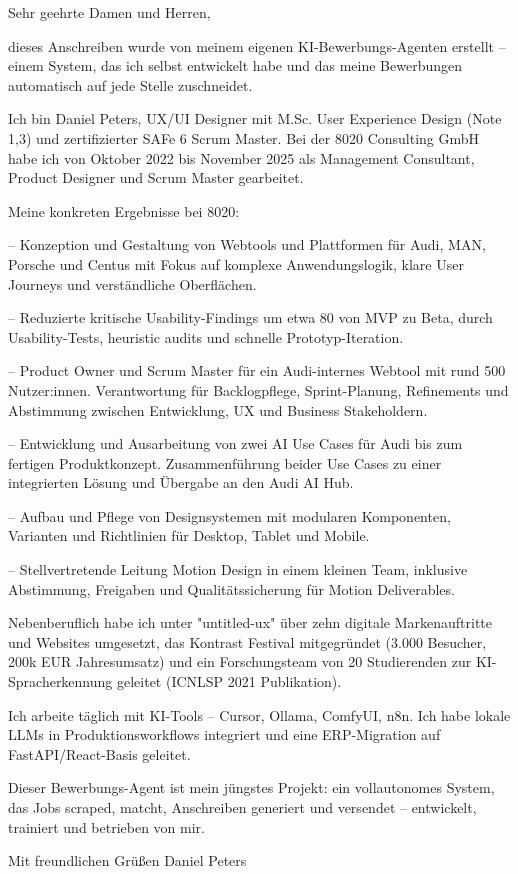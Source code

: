Sehr geehrte Damen und Herren,

dieses Anschreiben wurde von meinem eigenen KI-Bewerbungs-Agenten erstellt -- einem System,
das ich selbst entwickelt habe und das meine Bewerbungen automatisch auf jede Stelle zuschneidet.

Ich bin Daniel Peters, UX/UI Designer mit M.Sc. User Experience Design (Note 1,3) und
zertifizierter SAFe 6 Scrum Master. Bei der 8020 Consulting GmbH habe ich von Oktober 2022
bis November 2025 als Management Consultant, Product Designer und Scrum Master gearbeitet.

Meine konkreten Ergebnisse bei 8020:

-- Konzeption und Gestaltung von Webtools und Plattformen für Audi, MAN, Porsche und Centus
   mit Fokus auf komplexe Anwendungslogik, klare User Journeys und verständliche Oberflächen.

-- Reduzierte kritische Usability-Findings um etwa 80%
   von MVP zu Beta, durch Usability-Tests, heuristic audits und schnelle Prototyp-Iteration.

-- Product Owner und Scrum Master für ein Audi-internes Webtool mit rund 500 Nutzer:innen.
   Verantwortung für Backlogpflege, Sprint-Planung, Refinements und Abstimmung zwischen
   Entwicklung, UX und Business Stakeholdern.

-- Entwicklung und Ausarbeitung von zwei AI Use Cases für Audi bis zum fertigen Produktkonzept.
   Zusammenführung beider Use Cases zu einer integrierten Lösung und Übergabe an den Audi AI Hub.

-- Aufbau und Pflege von Designsystemen mit modularen Komponenten, Varianten und Richtlinien
   für Desktop, Tablet und Mobile.

-- Stellvertretende Leitung Motion Design in einem kleinen Team, inklusive Abstimmung,
   Freigaben und Qualitätssicherung für Motion Deliverables.

Nebenberuflich habe ich unter "untitled-ux" über zehn digitale Markenauftritte und Websites
umgesetzt, das Kontrast Festival mitgegründet (3.000 Besucher, 200k EUR Jahresumsatz) und
ein Forschungsteam von 20 Studierenden zur KI-Spracherkennung geleitet (ICNLSP 2021 Publikation).

Ich arbeite täglich mit KI-Tools -- Cursor, Ollama, ComfyUI, n8n. Ich habe lokale LLMs in
Produktionsworkflows integriert und eine ERP-Migration auf FastAPI/React-Basis geleitet.

Dieser Bewerbungs-Agent ist mein jüngstes Projekt: ein vollautonomes System, das Jobs scraped,
matcht, Anschreiben generiert und versendet -- entwickelt, trainiert und betrieben von mir.

Mit freundlichen Grüßen
Daniel Peters
